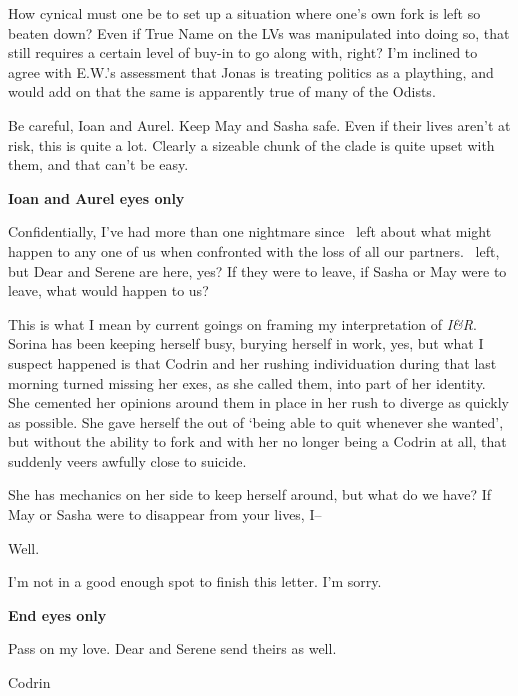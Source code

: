 How cynical must one be to set up a situation where one's own fork is left so beaten down? Even if True Name on the LVs was manipulated into doing so, that still requires a certain level of buy-in to go along with, right? I'm inclined to agree with E.W.'s assessment that Jonas is treating politics as a plaything, and would add on that the same is apparently true of many of the Odists.

Be careful, Ioan and Aurel. Keep May and Sasha safe. Even if their lives aren't at risk, this is quite a lot. Clearly a sizeable chunk of the clade is quite upset with them, and that can't be easy.

\textbf{Ioan and Aurel eyes only}

Confidentially, I've had more than one nightmare since \Partner\ left about what might happen to any one of us when confronted with the loss of all our partners. \Partner\ left, but Dear and Serene are here, yes? If they were to leave, if Sasha or May were to leave, what would happen to us?

This is what I mean by current goings on framing my interpretation of \emph{I\&R}. Sorina has been keeping herself busy, burying herself in work, yes, but what I suspect happened is that Codrin and her rushing individuation during that last morning turned missing her exes, as she called them, into part of her identity. She cemented her opinions around them in place in her rush to diverge as quickly as possible. She gave herself the out of `being able to quit whenever she wanted', but without the ability to fork and with her no longer being a Codrin at all, that suddenly veers awfully close to suicide.

She has mechanics on her side to keep herself around, but what do we have? If May or Sasha were to disappear from your lives, I--

Well.

I'm not in a good enough spot to finish this letter. I'm sorry.

\textbf{End eyes only}

Pass on my love. Dear and Serene send theirs as well.

Codrin
